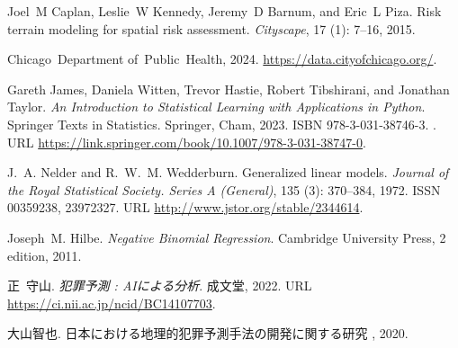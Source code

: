 Joel~M Caplan, Leslie~W Kennedy, Jeremy~D Barnum, and Eric~L Piza.
\newblock Risk terrain modeling for spatial risk assessment.
\newblock \emph{Cityscape}, 17 (1): 7--16, 2015.

Chicago~Department of~Public~Health, 2024.
\newblock \url{https://data.cityofchicago.org/}.

Gareth James, Daniela Witten, Trevor Hastie, Robert Tibshirani, and Jonathan Taylor.
\newblock \emph{An Introduction to Statistical Learning with Applications in Python}.
\newblock Springer Texts in Statistics. Springer, Cham, 2023.
\newblock ISBN 978-3-031-38746-3.
\newblock {}.
\newblock URL \url{https://link.springer.com/book/10.1007/978-3-031-38747-0}.

J.~A. Nelder and R.~W.~M. Wedderburn.
\newblock Generalized linear models.
\newblock \emph{Journal of the Royal Statistical Society. Series A (General)}, 135 (3): 370--384, 1972.
\newblock ISSN 00359238, 23972327.
\newblock URL \url{http://www.jstor.org/stable/2344614}.

Joseph~M. Hilbe.
\newblock \emph{Negative Binomial Regression}.
\newblock Cambridge University Press, 2 edition, 2011.

正~守山.
\newblock \emph{犯罪予測 : AIによる分析}.
\newblock 成文堂, 2022.
\newblock URL \url{https://ci.nii.ac.jp/ncid/BC14107703}.



大山智也.
\newblock 日本における地理的犯罪予測手法の開発に関する研究
\newblock , 2020.

